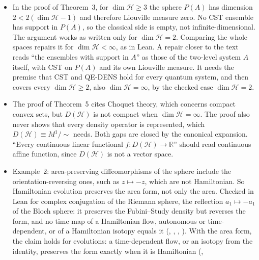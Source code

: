 \documentclass[11pt]{article}
\begin{document}
\begin{itemize}
  symplectic manifolds, and the projective space of an infinite-dimensional Hilbert space is an
  infinite-dimensional one. The finiteness comes from CST itself: the Liouville measure $\omega^n$
  needs a finite $n$. In Lean it comes from local compactness
  (), which every manifold modelled on a finite-dimensional
  space has.
\item In the proof of Theorem~3, for $\dim\mathcal H \ge 3$ the sphere $P(A)$ has dimension
  $2 < 2(\dim\mathcal H - 1)$ and therefore Liouville measure zero. No CST ensemble has support in
  $P(A)$, so the classical side is empty, not infinite-dimensional. The argument works as written
  only for $\dim\mathcal H = 2$. Comparing the whole spaces repairs it for
  $\dim\mathcal H < \infty$, as in Lean. A repair closer to the text reads ``the ensembles with
  support in $A$'' as those of the two-level system $A$ itself, with CST on $P(A)$ and its own
  Liouville measure. It needs the premise that CST and QE-DENS hold for every quantum system, and
  then covers every $\dim\mathcal H \ge 2$, also $\dim\mathcal H = \infty$, by the checked case
  $\dim\mathcal H = 2$.
\item The proof of Theorem~5 cites Choquet theory, which concerns compact convex sets, but
  $D(\mathcal H)$ is not compact when $\dim\mathcal H = \infty$. The proof also never shows that
  every density operator is represented, which $D(\mathcal H) \equiv M^1/{\sim}$ needs. Both gaps
  are closed by the canonical expansion. ``Every continuous linear functional
  $f : D(\mathcal H) \to \mathbb R$'' should read continuous affine function, since
  $D(\mathcal H)$ is not a vector space.
\item Example~2: area-preserving diffeomorphisms of the sphere include the orientation-reversing
  ones, such as $z \mapsto -z$, which are not Hamiltonian. So Hamiltonian evolution preserves the
  area form, not only the area. Checked in Lean for complex conjugation of the Riemann sphere,
  the reflection $a_1 \mapsto -a_1$ of the Bloch sphere: it preserves the Fubini--Study density
  but reverses the form, and no time map of a Hamiltonian flow, autonomous or time-dependent, or
  of a Hamiltonian isotopy equals it (,
  , ,
  ). With the area form, the claim holds for evolutions:
  a time-dependent flow, or an isotopy from the identity, preserves the form exactly when it is
  Hamiltonian (,

\end{itemize}
\end{document}
